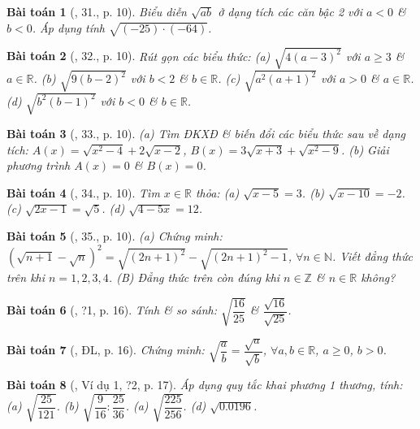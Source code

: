 \documentclass{article}
\newtheorem{baitoan}{Bài toán}
\begin{document}
\begin{baitoan}[\cite{SBT_Toan_9_tap_1}, 31., p. 10]
	Biểu diễn $\sqrt{ab}$ ở dạng tích các căn bậc 2 với $a < 0$ \& $b < 0$. Áp dụng tính $\sqrt{(-25)\cdot(-64)}$.
\end{baitoan}

\begin{baitoan}[\cite{SBT_Toan_9_tap_1}, 32., p. 10]
	Rút gọn các biểu thức: (a) $\sqrt{4(a - 3)^2}$ với $a\ge3$ \& $a\in\mathbb{R}$. (b) $\sqrt{9(b - 2)^2}$ với $b < 2$ \& $b\in\mathbb{R}$. (c) $\sqrt{a^2(a + 1)^2}$ với $a > 0$ \& $a\in\mathbb{R}$. (d) $\sqrt{b^2(b - 1)^2}$ với $b < 0$ \& $b\in\mathbb{R}$.
\end{baitoan}

\begin{baitoan}[\cite{SBT_Toan_9_tap_1}, 33., p. 10]
	(a) Tìm ĐKXĐ \& biến đổi các biểu thức sau về dạng tích: $A(x) = \sqrt{x^2 - 4} + 2\sqrt{x - 2}$, $B(x) = 3\sqrt{x + 3} + \sqrt{x^2 - 9}$. (b) Giải phương trình $A(x) = 0$ \& $B(x) = 0$.
\end{baitoan}

\begin{baitoan}[\cite{SBT_Toan_9_tap_1}, 34., p. 10]
	Tìm $x\in\mathbb{R}$ thỏa: (a) $\sqrt{x - 5} = 3$. (b) $\sqrt{x - 10} = -2$. (c) $\sqrt{2x - 1} = \sqrt{5}$. (d) $\sqrt{4 - 5x} = 12$.
\end{baitoan}

\begin{baitoan}[\cite{SBT_Toan_9_tap_1}, 35., p. 10]
	(a) Chứng minh: $\left(\sqrt{n + 1} - \sqrt{n}\right)^2 = \sqrt{(2n + 1)^2} - \sqrt{(2n + 1)^2 - 1}$, $\forall n\in\mathbb{N}$. Viết đẳng thức trên khi $n = 1,2,3,4$. (B) Đẳng thức trên còn đúng khi $n\in\mathbb{Z}$ \& $n\in\mathbb{R}$ không?
\end{baitoan}

\begin{baitoan}[\cite{SGK_Toan_9_tap_1}, ?1, p. 16]
	Tính \& so sánh: $\sqrt{\dfrac{16}{25}}$ \& $\dfrac{\sqrt{16}}{\sqrt{25}}$.
\end{baitoan}

\begin{baitoan}[\cite{SGK_Toan_9_tap_1}, ĐL, p. 16]
	Chứng minh: $\sqrt{\dfrac{a}{b}} = \dfrac{\sqrt{a}}{\sqrt{b}}$, $\forall a,b\in\mathbb{R}$, $a\ge0$, $b > 0$.
\end{baitoan}

\begin{baitoan}[\cite{SGK_Toan_9_tap_1}, Ví dụ 1, ?2, p. 17]
	Áp dụng quy tắc khai phương 1 thương, tính: (a) $\sqrt{\dfrac{25}{121}}$. (b) $\sqrt{\dfrac{9}{16}:\dfrac{25}{36}}$. (a) $\sqrt{\dfrac{225}{256}}$. (d) $\sqrt{0.0196}$.
\end{baitoan}
\end{document}

